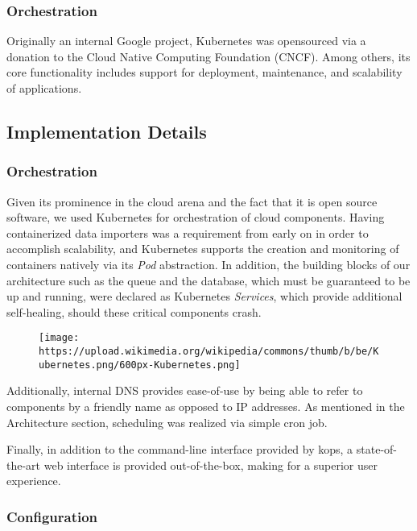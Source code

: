 \subsubsection{Orchestration}\label{orchestration}

Originally an internal Google project, Kubernetes was opensourced via a
donation to the Cloud Native Computing Foundation (CNCF). Among others,
its core functionality includes support for deployment, maintenance, and
scalability of applications.

\subsection{Implementation Details}\label{implementation-details}

\subsubsection{Orchestration}\label{orchestration-1}

Given its prominence in the cloud arena and the fact that it is open
source software, we used Kubernetes for orchestration of cloud
components. Having containerized data importers was a requirement from
early on in order to accomplish scalability, and Kubernetes supports the
creation and monitoring of containers natively via its \emph{Pod}
abstraction. In addition, the building blocks of our architecture such
as the queue and the database, which must be guaranteed to be up and
running, were declared as Kubernetes \emph{Services}, which provide
additional self-healing, should these critical components crash.

\begin{figure}[htbp]
\centering
\texttt{[image: https://upload.wikimedia.org/wikipedia/commons/thumb/b/be/Kubernetes.png/600px-Kubernetes.png]}
\caption{}
\end{figure}

Additionally, internal DNS provides ease-of-use by being able to refer
to components by a friendly name as opposed to IP addresses. As
mentioned in the Architecture section, scheduling was realized via
simple cron job.

Finally, in addition to the command-line interface provided by kops, a
state-of-the-art web interface is provided out-of-the-box, making for a
superior user experience.

\subsubsection{Configuration}\label{configuration}

